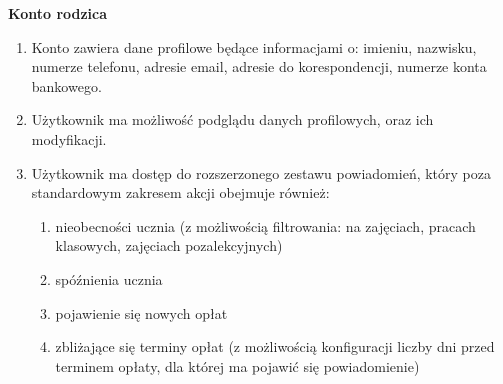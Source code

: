 \documentclass{article}
\begin{document}
\textbf{Konto rodzica}
\begin{enumerate}
	\item Konto zawiera dane profilowe będące informacjami o: imieniu, nazwisku, numerze telefonu, adresie email, adresie do korespondencji, numerze konta bankowego.
	\item Użytkownik ma możliwość podglądu danych profilowych, oraz ich modyfikacji.
	\item Użytkownik ma dostęp do rozszerzonego zestawu powiadomień, który poza standardowym zakresem akcji obejmuje również:
	\begin{enumerate}
		\item nieobecności ucznia (z możliwością filtrowania: na zajęciach, pracach klasowych, zajęciach pozalekcyjnych)
		\item spóźnienia ucznia
		\item pojawienie się nowych opłat
		\item zbliżające się terminy opłat (z możliwością konfiguracji liczby dni przed terminem opłaty, dla której ma pojawić się powiadomienie)
	\end{enumerate}


\end{enumerate}
\end{document}
